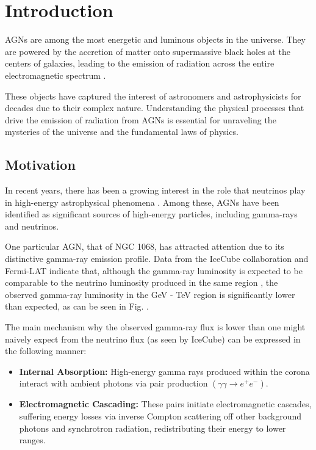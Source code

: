\chapter{Introduction}
\label{chap:Introduction}

AGNs are among the most energetic and luminous objects in the universe. They are powered by the accretion of matter onto supermassive black holes at the centers of galaxies, leading to the emission of radiation across the entire electromagnetic spectrum \citep{RadiativeProcesses}.

These objects have captured the interest of astronomers and astrophysicists for decades due to their complex nature. Understanding the physical processes that drive the emission of radiation from AGNs is essential for unraveling the mysteries of the universe and the fundamental laws of physics.

\section{Motivation}

In recent years, there has been a growing interest in the role that neutrinos play in high-energy astrophysical phenomena \citep{Eichmann_2022}. Among these, AGNs have been identified as significant sources of high-energy particles, including gamma-rays and neutrinos. 

One particular AGN, that of NGC 1068, has attracted attention due to its distinctive gamma-ray emission profile. Data from the IceCube collaboration \citep{IceCube2022} and Fermi-LAT \citep{Fermi12yeardata} indicate that, although the gamma-ray luminosity is expected to be comparable to the neutrino luminosity produced in the same region \citep{GammaRayModel2023}, the observed gamma-ray luminosity in the GeV - TeV region is significantly lower than expected, as can be seen in Fig. .

The main mechanism why the observed gamma-ray flux is lower than one might naively expect from the neutrino flux (as seen by IceCube) can be expressed in the following manner:

\begin{itemize}
    \item \textbf{Internal Absorption:} High-energy gamma rays produced within the corona interact with ambient photons via pair production $(\gamma\gamma \rightarrow e^+e^-)$.
    \item \textbf{Electromagnetic Cascading:} These pairs initiate electromagnetic cascades, suffering energy losses via inverse Compton scattering off other background photons and synchrotron radiation, redistributing their energy to lower ranges.
\end{itemize}

